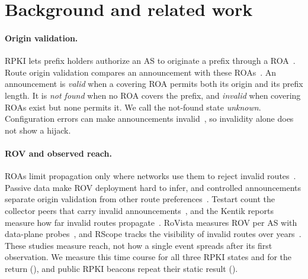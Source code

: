 \section{Background and related work}\label{sec:back}

\paragraph{Origin validation.}
RPKI lets prefix holders authorize an AS to originate a prefix through a ROA~\cite{rfc6480}.
Route origin validation compares an announcement with these ROAs~\cite{rfc6811}.
An announcement is \emph{valid} when a covering ROA permits both its origin and its prefix length.
It is \emph{not found} when no ROA covers the prefix, and \emph{invalid} when covering ROAs exist but none permits it.
We call the not-found state \emph{unknown}.
Configuration errors can make announcements invalid~\cite{chung2019rpki,li2026demystifying}, so invalidity alone does not show a hijack.

\paragraph{ROV and observed reach.}
ROAs limit propagation only where networks use them to reject invalid routes~\cite{gilad2017}.
Passive data make ROV deployment hard to infer, and controlled announcements separate origin validation from other route preferences~\cite{reuter2018rov}.
Testart \etal count the collector peers that carry invalid announcements~\cite{testart2020filter}, and the Kentik reports measure how far invalid routes propagate~\cite{madory2022kentik,madory2024kentik}.
RoVista measures ROV per AS with data-plane probes~\cite{li2023rovista}, and RScope tracks the visibility of invalid routes over years~\cite{li2026rscope}.
These studies measure reach, not how a single event spreads after its first observation.
We measure this time course for all three RPKI states and for the return (), and public RPKI beacons repeat their static result ().

